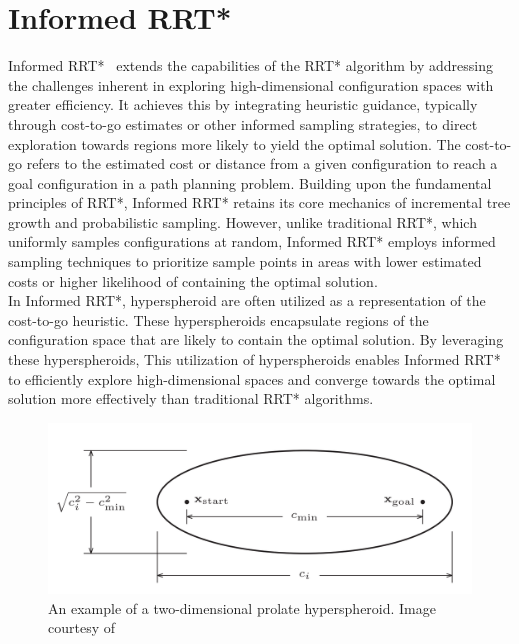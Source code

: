 \documentclass{ctuthesis}
\begin{document}
\section{Informed RRT*}
Informed RRT*~\cite{Gammell2018InformedRRTstar} extends the capabilities of the RRT* algorithm 
by addressing the challenges inherent in exploring high-dimensional configuration spaces 
with greater efficiency. 
It achieves this by integrating heuristic guidance, 
typically through cost-to-go estimates or other informed sampling strategies, 
to direct exploration towards regions more likely to yield the optimal solution.
The cost-to-go refers to the estimated cost or distance from a given 
configuration to reach a goal configuration in a path planning problem.  
Building upon the fundamental principles of RRT*, 
Informed RRT* retains its core mechanics of incremental tree growth and probabilistic sampling. 
However, unlike traditional RRT*, 
which uniformly samples configurations at random, 
Informed RRT* employs informed sampling techniques to prioritize sample 
points in areas with lower estimated costs or higher likelihood of containing 
the optimal solution.  
\\[12pt]
In Informed RRT*, 
hyperspheroid are often utilized as a representation of the cost-to-go heuristic. 
These hyperspheroids encapsulate regions of the configuration space that are likely 
to contain the optimal solution. 
By leveraging these hyperspheroids,   
This utilization of hyperspheroids enables Informed RRT* to efficiently 
explore high-dimensional spaces and converge towards the optimal solution more effectively 
than traditional RRT* algorithms.
\begin{figure}[!ht]
  \centering 
      \includegraphics[width=\textwidth]{figChap3/InformedRRTstar_elips.png}
      \caption{An example of a two-dimensional prolate hyperspheroid. 
      Image courtesy of \cite{Gammell2018InformedRRTstar}}
      \label{fig:elips}  
\end{figure} 
\end{document}

